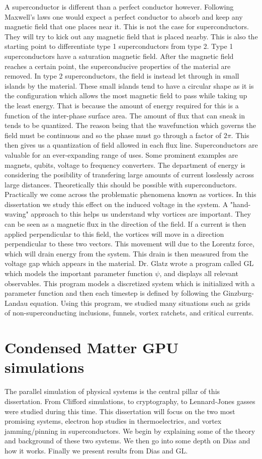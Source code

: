  A superconductor is different than a perfect conductor however. Following Maxwell's laws one would expect a perfect conductor to absorb and keep any magnetic field that one places near it. This is not the case for superconductors. They will try to kick out any magnetic field that is placed nearby. This is also the starting point to differentiate type 1 superconductors from type 2. Type 1 superconductors have a saturation magnetic field. After the magnetic field reaches a certain point, the superconducive properties of the material are removed. In type 2 superconductors, the field is instead let through in small islands by the material. These small islands tend to have a circular shape as it is the configuration which allows the most magnetic field to pass while taking up the least energy. That is because the amount of energy required for this is a function of the inter-phase surface area. The amount of flux that can sneak in tends to be quantized. The reason being that the wavefunction which governs the field must be continuous and so the phase must go through a factor of $2\pi$. This then gives us a quantization of field allowed in each flux line.  
Superconductors are valuable for an ever-expanding range of uses. Some prominent examples are magnets, qubits, voltage to frequency converters. The department of energy is considering the posibility of transfering large amounts of current losslessly across large distances. Theoretically this should be possible with superconductors. Practically we come across the problematic phenomena known as vortices.  In this dissertation we study this effect on the induced voltage in the system. A "hand-waving" approach to this helps us understand why vortices are important. They can be seen as a magnetic flux in the direction of the field. If a current is then applied perpendicular to this field, the vortices will move in a direction perpendicular to these two vectors. This movement will due to the Lorentz force, which will drain energy from the system. This drain is then measured from the voltage gap which appears in the material. Dr. Glatz wrote a program called {\sc GL} which models the important parameter function $\psi$, and displays all relevant observables. This program models a discretized system which is initialized with a parameter function and then each timestep is defined by following the Ginzburg-Landau equation. Using this program, we studied many situations such as grids of non-superconducting inclusions, funnels, vortex ratchets, and critical currents. 

\section{Condensed Matter GPU simulations}
The parallel simulation of physical systems is the central pillar of this dissertation. From Clifford simulations, to cryptography, to Lennard-Jones gasses were studied during this time. This dissertation will focus on the two most promising systems, electron hop studies in thermoelectrics, and vortex jamming/pinning in superconductors. We begin by explaining some of the theory and background of these two systems. We then go into some depth on Dias and how it works. Finally we present results from Dias and GL. 

